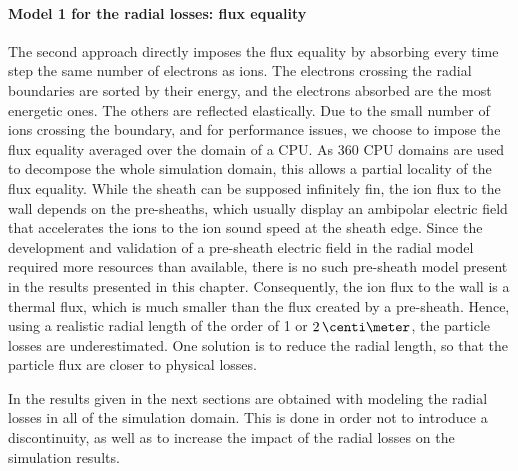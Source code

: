 \paragraph{Model 1 for the  radial losses\string: flux equality\\}
The second approach directly imposes the flux equality by absorbing every time step the same number of electrons as ions.
The electrons crossing the radial boundaries are sorted by their energy, and the electrons absorbed are the most energetic ones.
The others are reflected elastically.
Due to the small number of ions crossing the boundary, and for performance issues, we choose to impose the flux equality averaged over the domain of a CPU.
As 360 CPU domains are used to decompose the whole simulation domain, this allows a partial locality of the flux equality. 
\vspace{1ex}
While the sheath can be supposed infinitely fin, the ion flux to the wall depends on the pre-sheaths, which usually display an ambipolar electric field that accelerates the ions to the ion sound speed at the sheath edge.
Since the development and validation of a pre-sheath electric field in the radial model required more resources than available, there is no such pre-sheath model present in the results presented in this chapter.
Consequently, the ion flux to the wall is a thermal flux, which is much smaller than the flux created by a pre-sheath.
Hence, using a realistic radial length  of the order of 1 or $2\,\centi\meter$, the particle losses are underestimated.
One solution is to reduce the radial length, so that the particle flux are closer to physical losses.

In the results given in the next sections are obtained with modeling the radial losses in all of the simulation domain.
This is done in order not to introduce a discontinuity, as well as to increase the impact of the radial losses on the simulation results.

